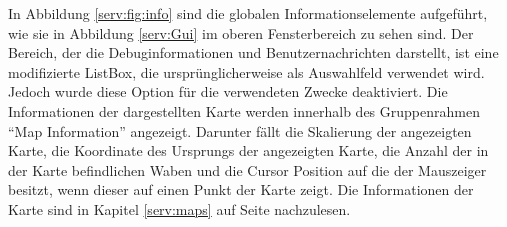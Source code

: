 In Abbildung \ref{serv:fig:info} sind die globalen
Informationselemente aufgeführt, wie sie in Abbildung \ref{serv:Gui}
im oberen Fensterbereich zu sehen sind. Der Bereich, der die
Debuginformationen und Benutzernachrichten darstellt, ist eine
modifizierte ListBox, die ursprünglicherweise als Auswahlfeld
verwendet wird. Jedoch wurde diese Option für die verwendeten Zwecke
deaktiviert. Die Informationen der dargestellten Karte werden
innerhalb des Gruppenrahmen "`Map Information"' angezeigt. Darunter
fällt die Skalierung der angezeigten Karte, die Koordinate des
Ursprungs der angezeigten Karte, die Anzahl der in der Karte
befindlichen Waben und die Cursor Position auf die der Mauszeiger
besitzt, wenn dieser auf einen Punkt der Karte zeigt. Die
Informationen der Karte sind in Kapitel \ref{serv:maps} auf Seite \pageref{serv:maps} nachzulesen. 
